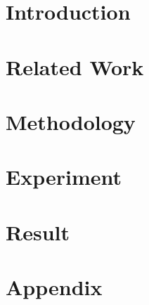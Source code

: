 \section{Introduction}

\section{Related Work}

\section{Methodology}

\section{Experiment}

\section{Result}

%
%

\appendix
\section{Appendix}
